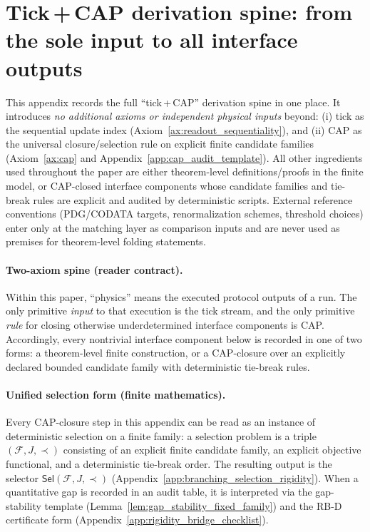 \section{\texorpdfstring{Tick\,+\,CAP}{Tick+CAP} derivation spine: from the sole input to all interface outputs}
\label{app:tick_cap_derivation}

This appendix records the full ``tick\,+\,CAP'' derivation spine in one place.
It introduces \emph{no additional axioms or independent physical inputs} beyond:
(i) tick as the sequential update index (Axiom~\ref{ax:readout_sequentiality}), and
(ii) CAP as the universal closure/selection rule on explicit finite candidate families (Axiom~\ref{ax:cap} and Appendix~\ref{app:cap_audit_template}).
All other ingredients used throughout the paper are either theorem-level definitions/proofs in the finite model, or CAP-closed interface components whose candidate families and tie-break rules are explicit and audited by deterministic scripts.
External reference conventions (PDG/CODATA targets, renormalization schemes, threshold choices) enter only at the matching layer as comparison inputs and are never used as premises for theorem-level folding statements.

\paragraph{Two-axiom spine (reader contract).}
Within this paper, ``physics'' means the executed protocol outputs of a run.
The only primitive \emph{input} to that execution is the tick stream, and the only primitive \emph{rule} for closing otherwise underdetermined interface components is CAP.
Accordingly, every nontrivial interface component below is recorded in one of two forms: a theorem-level finite construction, or a CAP-closure over an explicitly declared bounded candidate family with deterministic tie-break rules.

\paragraph{Unified selection form (finite mathematics).}
\AuditTag Every CAP-closure step in this appendix can be read as an instance of deterministic selection on a finite family:
a selection problem is a triple $(\mathcal{F},J,\prec)$ consisting of an explicit finite candidate family, an explicit objective functional, and a deterministic tie-break order.
The resulting output is the selector $\mathsf{Sel}(\mathcal{F},J,\prec)$ (Appendix~\ref{app:branching_selection_rigidity}).
When a quantitative gap is recorded in an audit table, it is interpreted via the gap-stability template (Lemma~\ref{lem:gap_stability_fixed_family}) and the RB-D certificate form (Appendix~\ref{app:rigidity_bridge_checklist}).

